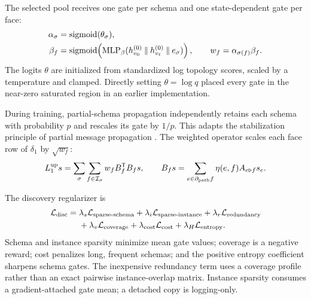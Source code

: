 The selected pool receives one gate per schema and one state-dependent gate per face:
\begin{align}
  \alpha_\sigma &= \operatorname{sigmoid}(\theta_\sigma),\\
  \beta_f &= \operatorname{sigmoid}\!\left(
  \operatorname{MLP}_{\beta}
  (h_{v_0}^{(0)}\mathbin\Vert h_{v_\ell}^{(0)}\mathbin\Vert e_\sigma)
  \right),\qquad
  w_f=\alpha_{\sigma(f)}\beta_f.
  \label{eq:gates}
\end{align}
The logits $\theta$ are initialized from standardized log topology scores, scaled by a temperature
and clamped. Directly setting $\theta=\log q$ placed every gate in the near-zero saturated region
in an earlier implementation.

During training, partial-schema propagation independently retains each schema with probability
$p$ and rescales its gate by $1/p$. This adapts the stabilization principle of partial message
propagation \cite{jiang2022pmmm}. The weighted operator scales each face row of $\delta_1$ by
$\sqrt{w_f}$:
\begin{equation}
  L_1^{\mathrm{up}}s=
  \sum_{\sigma}\sum_{f\in\mathcal{I}_\sigma}
  w_f B_f^{\mathsf{T}}B_f s,\qquad
  B_f s=\sum_{e\in\partial_{\mathrm{path}}f}\eta(e,f)A_{e\triangleright f}s_e.
  \label{eq:weighted-up}
\end{equation}

The discovery regularizer is
\begin{equation}
  \begin{aligned}
  \mathcal{L}_{\mathrm{disc}}={}&
  \lambda_s\mathcal{L}_{\mathrm{sparse\text{-}schema}}+
  \lambda_i\mathcal{L}_{\mathrm{sparse\text{-}instance}}+
  \lambda_r\mathcal{L}_{\mathrm{redundancy}}\\
  &+\lambda_v\mathcal{L}_{\mathrm{coverage}}+
  \lambda_{\mathrm{cost}}\mathcal{L}_{\mathrm{cost}}+
  \lambda_H\mathcal{L}_{\mathrm{entropy}}.
  \end{aligned}
  \label{eq:discovery-loss}
\end{equation}
Schema and instance sparsity minimize mean gate values; coverage is a negative reward; cost
penalizes long, frequent schemas; and the positive entropy coefficient sharpens schema gates. The
inexpensive redundancy term uses a coverage profile rather than an exact pairwise instance-overlap
matrix. Instance sparsity consumes a gradient-attached gate mean; a detached copy is logging-only.

